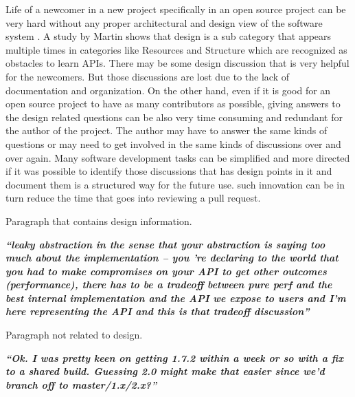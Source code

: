 Life of a newcomer in a new project specifically in an open source project can be very hard without any proper architectural and design view of the software system \cite{Steinmacher2014}. A study by Martin \cite{Robillard2009} shows that design is a sub category that appears multiple times in categories like Resources and Structure which are recognized as obstacles to learn APIs. There may be some design discussion that is very helpful for the newcomers. But those discussions are lost due to the lack of documentation and organization. On the other hand, even if it is good for an open source project to have as many contributors as possible, giving answers to the design related questions can be also very time consuming and redundant for the author of the project. The author may have to answer the same kinds of questions or may need to get involved in the same kinds of discussions over and over again. Many software development tasks can be simplified and more directed if it was possible to identify those discussions that has design points in it and document them is a structured way for the future use. such innovation can be in turn reduce the time that goes into reviewing a pull request.
\begin{table}
	\caption{Paragraph that contains design information.\cite{Viviani2018}}	
		\textbf{\textit{``leaky abstraction in the sense that your abstraction is saying too much about the implementation -- you 're declaring to the world that you had to make compromises on your API to get other outcomes (performance), there has to be a tradeoff between pure perf and the best internal implementation and the API we expose to users and I'm here representing the API and this is that tradeoff discussion''}}	
\end{table}
\begin{table}
	\caption{Paragraph not related to design.\cite{Viviani2018}}
	\textbf{\textit{``Ok. I was pretty keen on getting 1.7.2 within a week or so with a fix to a shared build. Guessing 2.0 might make that easier since we'd branch off to master/1.x/2.x?''}}
\end{table}

